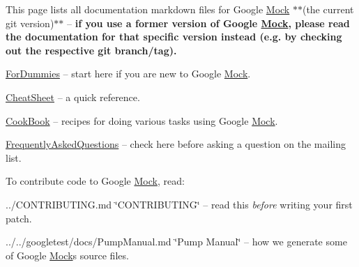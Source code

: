 This page lists all documentation markdown files for Google \mbox{\hyperlink{classMock}{Mock}} $\ast$$\ast$(the current git version)$\ast$$\ast$ -- {\bfseries{if you use a former version of Google \mbox{\hyperlink{classMock}{Mock}}, please read the documentation for that specific version instead (e.\+g. by checking out the respective git branch/tag).}}


\begin{DoxyItemize}
\item \mbox{\hyperlink{ForDummies_8md}{For\+Dummies}} -- start here if you are new to Google \mbox{\hyperlink{classMock}{Mock}}.
\item \mbox{\hyperlink{CheatSheet_8md}{Cheat\+Sheet}} -- a quick reference.
\item \mbox{\hyperlink{CookBook_8md}{Cook\+Book}} -- recipes for doing various tasks using Google \mbox{\hyperlink{classMock}{Mock}}.
\item \mbox{\hyperlink{FrequentlyAskedQuestions_8md}{Frequently\+Asked\+Questions}} -- check here before asking a question on the mailing list.
\end{DoxyItemize}

To contribute code to Google \mbox{\hyperlink{classMock}{Mock}}, read\+:


\begin{DoxyItemize}
\item ../\+C\+O\+N\+T\+R\+I\+B\+U\+T\+I\+NG.md \char`\"{}\+C\+O\+N\+T\+R\+I\+B\+U\+T\+I\+N\+G\char`\"{} -- read this {\itshape before} writing your first patch.
\item ../../googletest/docs/\+Pump\+Manual.md \char`\"{}\+Pump Manual\char`\"{} -- how we generate some of Google \mbox{\hyperlink{classMock}{Mock}}\textquotesingle{}s source files. 
\end{DoxyItemize}